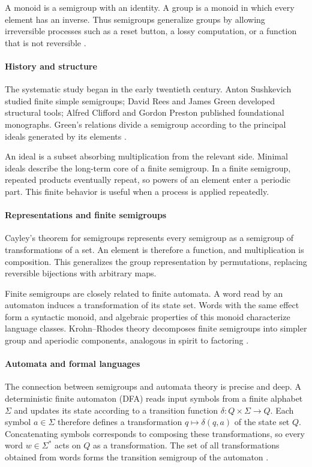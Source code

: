 A monoid is a semigroup with an identity. A group is a monoid in which every element has an inverse. Thus semigroups generalize groups by allowing irreversible processes such as a reset button, a lossy computation, or a function that is not reversible \cite{semigroup_ref1}.

\paragraph{History and structure}
The systematic study began in the early twentieth century. Anton Sushkevich studied finite simple semigroups; David Rees and James Green developed structural tools; Alfred Clifford and Gordon Preston published foundational monographs. Green's relations divide a semigroup according to the principal ideals generated by its elements \cite{semigroup_ref2}.

An ideal is a subset absorbing multiplication from the relevant side. Minimal ideals describe the long-term core of a finite semigroup. In a finite semigroup, repeated products eventually repeat, so powers of an element enter a periodic part. This finite behavior is useful when a process is applied repeatedly.

\paragraph{Representations and finite semigroups}
Cayley's theorem for semigroups represents every semigroup as a semigroup of transformations of a set. An element is therefore a function, and multiplication is composition. This generalizes the group representation by permutations, replacing reversible bijections with arbitrary maps.

Finite semigroups are closely related to finite automata. A word read by an automaton induces a transformation of its state set. Words with the same effect form a syntactic monoid, and algebraic properties of this monoid characterize language classes. Krohn--Rhodes theory decomposes finite semigroups into simpler group and aperiodic components, analogous in spirit to factoring \cite{semigroup_ref3}.

\paragraph{Automata and formal languages}
The connection between semigroups and automata theory is precise and deep. A deterministic finite automaton (DFA) reads input symbols from a finite alphabet $\Sigma$ and updates its state according to a transition function $\delta\colon Q\times\Sigma\to Q$. Each symbol $a\in\Sigma$ therefore defines a transformation $q\mapsto\delta(q,a)$ of the state set $Q$. Concatenating symbols corresponds to composing these transformations, so every word $w\in\Sigma^*$ acts on $Q$ as a transformation. The set of all transformations obtained from words forms the transition semigroup of the automaton \cite{semigroup_ref3}.

